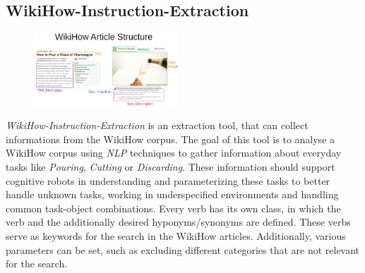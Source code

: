\subsection{WikiHow-Instruction-Extraction}
\label{sec:WikiHow}

\begin{figure}
	\centering
	\includegraphics[width=0.48\textwidth]{Graphics/WikiHow Article Structure.png}
\end{figure}
\textit{WikiHow-Instruction-Extraction} \cite{wikihow-extraction}  is an extraction tool, that can collect informations from the WikiHow \cite{wikihow} corpus. 
The goal of this tool is to analyse a WikiHow corpus using \textit{NLP} techniques to gather information about everyday tasks like \textit{Pouring}, \textit{Cutting} or \textit{Discarding}. 
These information should support cognitive robots in understanding and parameterizing these tasks to better handle unknown tasks, working in underspecified environments and handling common task-object combinations.
Every verb has its own class, in which the verb and the additionally desired hyponyms/synonyms are defined. These verbs serve as keywords for the search in the WikiHow \cite{wikihow} articles. Additionally, various parameters can be set, such as excluding different categories that are not relevant for the search.